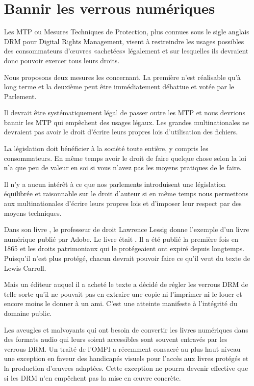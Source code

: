 \chapter{Bannir les verrous numériques}\label{verrous}

Les MTP ou Mesures Techniques de
Protection, plus
connues sous le sigle anglais DRM pour Digital
Rights Management, visent à restreindre les usages possibles des consommateurs d’œuvres «achetées»
légalement et sur lesquelles ils devraient donc pouvoir exercer tous leurs droits. 

Nous proposons deux mesures les concernant. La première n'est réalisable qu'à long terme et la deuxième peut être immédiatement débattue et votée par le Parlement.

\begin{mesure}
 Il devrait être systématiquement légal de passer outre les MTP et nous devrions bannir les MTP qui
empêchent des usages légaux. Les grandes multinationales ne devraient pas avoir le droit d’écrire
leurs propres lois d’utilisation des fichiers.
\end{mesure}

La législation doit bénéficier à la société toute entière, y compris les consommateurs. En même temps avoir le droit
de faire quelque chose selon la loi n’a que peu de valeur en soi si vous n’avez pas les moyens
pratiques de le faire.

Il n’y a aucun intérêt à ce que nos parlements introduisent une législation équilibrée et
raisonnable sur le droit d’auteur si en même temps nous permettons aux multinationales d’écrire
leurs propres lois et d’imposer leur respect par des moyens techniques.

Dans son livre , le professeur de droit Lawrence Lessig donne l’exemple d’un livre
numérique publié par Adobe. Le livre était . Il a été publié la première
fois en 1865 et les droits patrimoniaux qui le protégeaient ont expiré depuis longtemps. Puisqu’il n’est plus protégé,
chacun devrait pouvoir faire ce qu’il veut du texte de Lewis Carroll.

Mais un éditeur auquel il a acheté le texte a décidé de régler les verrous DRM de telle sorte qu'il ne pouvait pas en extraire une copie ni l’imprimer ni le louer et encore moins le donner à un ami. C'est une atteinte manifeste à l'intégrité du domaine public.  

Les aveugles et malvoyants qui ont besoin de convertir les livres numériques dans des formats audio
qui leurs soient accessibles sont souvent entravés par les verrous DRM. Un traité de l'OMPI a récemment consacré au plus haut niveau une exception en faveur des handicapés visuels pour l'accès aux livres protégés et la production d'œuvres adaptées. Cette exception ne pourra devenir effective que si les DRM n'en empêchent pas la mise en œuvre concrète.

